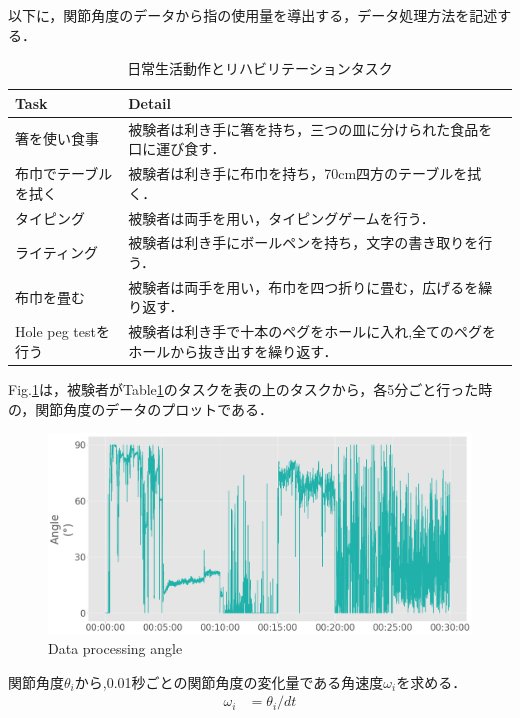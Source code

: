以下に，関節角度のデータから指の使用量を導出する，データ処理方法を記述する．
\begin{table}[H]
  \caption{日常生活動作とリハビリテーションタスク}
  \label{table:tasks}
  \centering
  \begin{tabular}{ll}
    \hline
    Task &  Detail  \\
    \hline \hline
箸を使い食事&
被験者は利き手に箸を持ち，三つの皿に分けられた食品を口に運び食す．\\

布巾でテーブルを拭く&
被験者は利き手に布巾を持ち，70cm四方のテーブルを拭く．\\

タイピング&
被験者は両手を用い，タイピングゲームを行う．\\

ライティング&
被験者は利き手にボールペンを持ち，文字の書き取りを行う．\\

布巾を畳む&
被験者は両手を用い，布巾を四つ折りに畳む，広げるを繰り返す．\\

Hole peg testを行う&
被験者は利き手で十本のペグをホールに入れ,全てのペグをホールから抜き出すを繰り返す．\\

    \hline
  \end{tabular}
\end{table}


Fig.\ref{fig:angle}は，被験者がTable\ref{table:tasks}のタスクを表の上のタスクから，各5分ごと行った時の，関節角度のデータのプロットである．

\begin{figure}[H]
  \centering
  \includegraphics[width=0.8\linewidth]{fig/angle}
  \caption{Data processing angle}
  \label{fig:angle}
\end{figure}

関節角度$\theta_i$から,0.01秒ごとの関節角度の変化量である角速度$\omega_i$を求める．
\begin{eqnarray}
\omega_i & = \theta_i /dt
\end{eqnarray}

